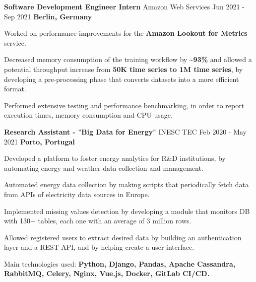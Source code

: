

\begin{cventries}

  \cventry
    {\textbf{Software Development Engineer Intern}} %
    {Amazon Web Services \href{https://aws.amazon.com/}{\faExternalLink}} %
    {Jun 2021 - Sep 2021} %
    {\textbf{Berlin, Germany}} %
    {
      \begin{cvitems} %
        \item {Worked on performance improvements for the {\textbf{Amazon Lookout for Metrics \href{https://aws.amazon.com/lookout-for-metrics/}{\faExternalLink}}} service.}
        \item {Decreased memory consumption of the training workflow by \textbf{\~{}93\%} and allowed a potential throughput increase from \textbf{50K time series to 1M time series}, by developing a pre-processing phase that converts datasets into a more efficient format.}
        \item {Performed extensive testing and performance benchmarking, in order to report execution times, memory consumption and CPU usage.}
      \end{cvitems}
    }

  \cventry
    {\textbf{Research Assistant - "Big Data for Energy"}} %
    {INESC TEC \href{https://www.inesctec.pt/en}{\faExternalLink}} %
    {Feb 2020 - May 2021} %
    {\textbf{Porto, Portugal}} %
    {
      \begin{cvitems} %
        \item {Developed a platform to foster energy analytics for R\&D institutions, by automating energy and weather data collection and management.}
        \item {Automated energy data collection by making scripts that periodically fetch data from APIs of electricity data sources in Europe.}
        \item {Implemented missing values detection by developing a module that monitors DB with 130+ tables, each one with an average of 3 million rows.}
        \item {Allowed registered users to extract desired data by building an authentication layer and a REST API, and by helping create a user interface.}
        \item {Main technologies used: \textbf{Python, Django, Pandas, Apache Cassandra, RabbitMQ, Celery, Nginx, Vue.js, Docker, GitLab CI/CD.}}
      \end{cvitems}
    }


\end{cventries}
